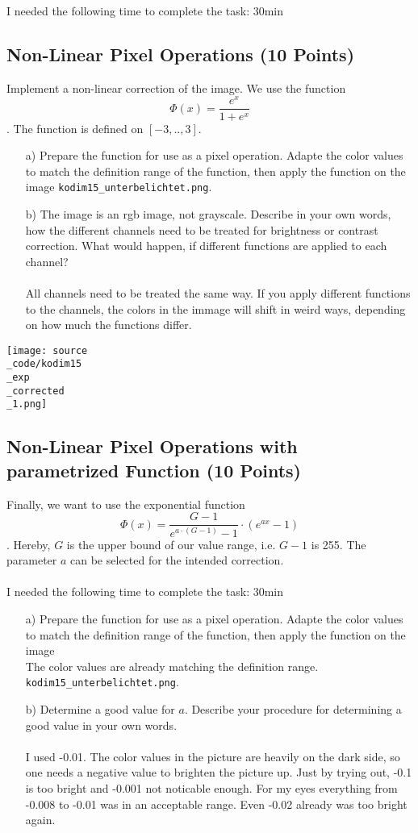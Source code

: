 I needed the following time to complete the task: 30min

\subsection{Non-Linear Pixel Operations (10 Points)}

Implement a non-linear correction of the image. We use the function $$ \Phi(x) = \frac{e^x}{1+e^x}$$. The function is defined on $[-3,..,3]$. 

\begin{enumerate}
\item[a)] Prepare the function for use as a pixel operation. Adapte the color values to match the definition range of the function, then apply the function on the image \texttt{kodim15\_unterbelichtet.png}.
\item[b)] The image is an rgb image, not grayscale. Describe in your own words, how the different channels need to be treated for brightness or contrast correction. What would happen,
if different functions are applied to each channel?\\
\\
All channels need to be treated the same way. If you apply different functions to the channels, the colors in the immage will shift in weird ways, depending on how much the functions differ.
\end{enumerate}

\texttt{[image: source\\\_code/kodim15\\\_exp\\\_corrected\\\_1.png]}

\subsection{Non-Linear Pixel Operations with parametrized Function (10 Points)}

Finally, we want to use the exponential function $$ \Phi(x) = \frac{G-1}{e^{a \cdot (G-1)} - 1} \cdot (e^{ax} - 1)$$. Hereby, $G$ is the upper bound of our value range, i.e. $G-1$ is 255. The
parameter $a$ can be selected for the intended correction.\\
\\
I needed the following time to complete the task: 30min

\begin{enumerate}
\item[a)] Prepare the function for use as a pixel operation. Adapte the color values to match the definition range of the function, then apply the function on the image\\
The color values are already matching the definition range.
\texttt{kodim15\_unterbelichtet.png}.
\item[b)] Determine a good value for $a$. Describe your procedure for determining a good value in your own words.\\
\\
I used -0.01. The color values in the picture are heavily on the dark side, so one needs a negative value to brighten the picture up. Just by trying out, -0.1 is too bright and -0.001 not noticable enough. For my eyes everything from -0.008 to -0.01 was in an acceptable range. Even -0.02 already was too bright again.
\end{enumerate}

